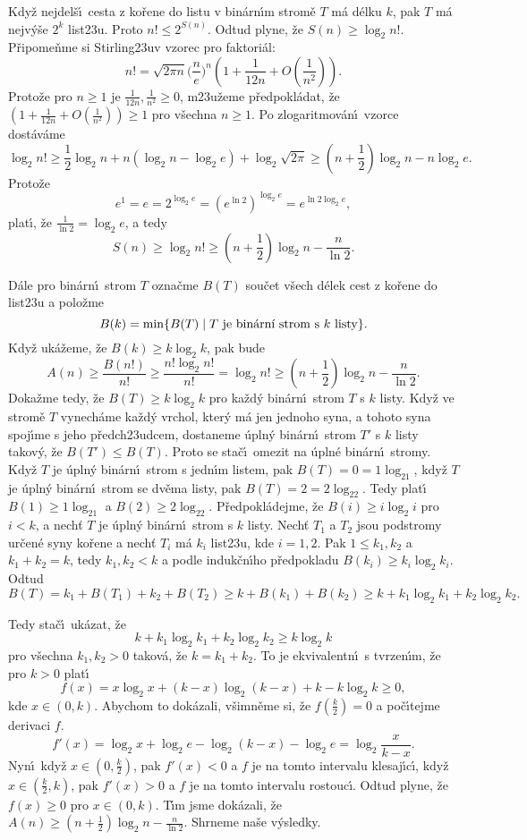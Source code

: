 \documentclass[a4paper,12pt]{article}
\begin{document}
\flushpar Kdy\v z nejdel\v s\'\i\ cesta z ko\v rene do listu v 
bin\'arn\'\i m strom\v e $T$ m\'a d\'elku $k$, pak $T$ m\'a nejv\'y\v se $
2^k$ 
list\accent23u. Proto $n!\le 2^{S(n)}$. Odtud plyne, \v ze $S(n)\ge\log_
2n!$.
P\v ripome\v nme si Stirling\accent23uv vzorec pro faktori\'al: 
$$n!=\sqrt {2\pi n}\big(\frac ne\big)^n(1+\frac 1{12n}+O(\frac 1{
n^2})).$$
Proto\v ze pro $n\ge 1$ je $\frac 1{12n},\frac 1{n^2}\ge 0$, m\accent23u\v zeme 
p\v redpokl\'adat, \v ze $(1+\frac 1{12n}+O(\frac 1{n^2}))\ge 1$ pro v\v sechna $
n\ge 1$. Po 
zlogaritmov\'an\'\i\ vzorce dost\'av\'ame 
$$\log_2n!\ge\frac 12\log_2n+n(\log_2n-\log_2e)+\log_2\sqrt {2\pi}
\ge (n+\frac 12)\log_2n-n\log_2e.$$
Proto\v ze  
$$e^1=e=2^{\log_2e}=(e^{\ln2})^{\log_2e}=e^{\ln2\log_2e},$$
plat\'\i , \v ze $\frac 1{\ln2}=\log_2e$, a tedy  
$$S(n)\ge\log_2n!\ge (n+\frac 12)\log_2n-\frac n{\ln2}.$$
\medskip

\flushpar D\'ale pro bin\'arn\'\i\ strom $T$ ozna\v cme $B(T)$ sou\v cet v\v sech 
d\'elek cest z ko\v rene do list\accent23u a polo\v zme 
$$B(k)=\min\{B(T)\mid T\text{\rm\ je bin\'arn\'\i\ strom s $k$ listy}
\}.$$
Kdy\v z uk\'a\v zeme, \v ze $B(k)\ge k\log_2k$, pak bude 
$$A(n)\ge\frac {B(n!)}{n!}\ge\frac {n!\log_2n!}{n!}=\log_2n!\ge (
n+\frac 12)\log_2n-\frac n{\ln2}.$$
Doka\v zme tedy, \v ze $B(T)\ge k\log_2k$ pro ka\v zd\'y bin\'arn\'\i\ 
strom $T$ s $k$ listy. Kdy\v z ve strom\v e $T$ vynech\'ame ka\v zd\'y 
vrchol, kter\'y m\'a jen jednoho syna, a tohoto syna spoj\'\i me 
s jeho p\v redch\accent23udcem, dostaneme \'upln\'y bin\'arn\'\i\ 
strom $T'$ s $k$ listy tako\-v\'y, \v ze $B(T')\le B(T)$. Proto se sta\v c\'\i\  
omezit na \'upln\'e bin\'arn\'\i\ stromy. Kdy\v z $T$ je \'upln\'y 
bin\'arn\'\i\ strom s jedn\'\i m listem, pak $B(T)=0=1\log_21$, 
kdy\v z $T$ je \'upln\'y bin\'arn\'\i\ strom se dv\v ema listy, pak 
$B(T)=2=2\log_22$. Tedy plat\'\i\ $B(1)\ge 1\log_21$ a $B(2)\ge 2\log_
22$. 
P\v redpokl\'adejme, \v ze $B(i)\ge i\log_2i$ pro $i<k$, a nech\v t $
T$ je 
\'upln\'y bin\'arn\'\i\ strom s $k$ listy. Nech\v t $T_1$ a $T_2$ jsou 
podstromy ur\v cen\'e syny ko\v rene a nech\v t $T_i$ m\'a $k_i$ 
list\accent23u, kde $i=1,2$. Pak $1\le k_1,k_2$ a $k_1+k_2=k$, tedy 
$k_1,k_2<k$ a podle induk\v cn\'\i ho p\v redpokladu $B(k_i)\ge k_
i\log_2k_i$. 
Odtud 
$$B(T)=k_1+B(T_1)+k_2+B(T_2)\ge k+B(k_1)+B(k_2)\ge k+k_1\log_2k_1
+k_2\log_2k_2.$$
\medskip

\flushpar Tedy sta\v c\'\i\ uk\'azat, \v ze 
$$k+k_1\log_2k_1+k_2\log_2k_2\ge k\log_2k$$
pro v\v sechna $k_1,k_2>0$ takov\'a, \v ze $k=k_1+k_2$. To je 
ekvivalentn\'\i\ s tvrzen\'\i m, \v ze pro $k>0$ plat\'\i\ 
$$f(x)=x\log_2x+(k-x)\log_2(k-x)+k-k\log_2k\ge 0,$$
kde $x\in (0,k)$. 
Abychom to dok\'azali, v\v simn\v eme si, \v ze $f(\frac k2)=0$ a  
po\v c\'\i\-tejme derivaci $f$.
$$f'(x)=\log_2x+\log_2e-\log_2(k-x)-\log_2e=\log_2\frac x{k-x}.$$
Nyn\'\i\ kdy\v z $x\in (0,\frac k2)$, pak $f'(x)<0$ a $f$ je na tomto intervalu 
klesaj\'\i c\'\i , kdy\v z $x\in (\frac k2,k)$, pak $f'(x)>0$ a $
f$ je na tomto 
intervalu rostouc\'\i . Odtud plyne, \v ze $f(x)\ge 0$ pro $x\in 
(0,k)$.
T\'\i m jsme dok\'azali, \v ze $A(n)\ge (n+\frac 12)\log_2n-\frac 
n{\ln2}$. Shrneme 
na\v se v\'ysledky.
\medskip
\end{document}
